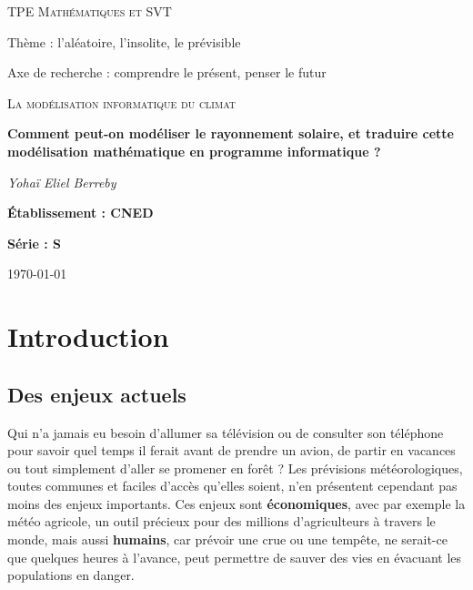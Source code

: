 \documentclass[12pt]{article}
\begin{document}

\begin{titlepage}
	\centering
	
	{\scshape\large TPE Mathématiques et SVT\par}
	\vspace{0.2cm}	
	{ \Large Thème : l'aléatoire, l'insolite, le prévisible\par }
	Axe de recherche : comprendre le présent, penser le futur\par
	\vspace{1.5cm}

	{\scshape\LARGE La modélisation informatique du climat \par}
	\vspace{1cm}
	{\huge\bfseries Comment peut-on modéliser le rayonnement solaire, et traduire cette modélisation mathématique en programme informatique ?\par}

	\vspace{1cm}
	{\Large\itshape Yohaï Eliel Berreby\par}
	
	\vfill
	
	
	{\Large\bfseries Établissement : CNED\par}
	\vspace{0.2cm}
	{\Large \bfseries Série : S }

	\vfill

	{\large \today\par}
\end{titlepage}


\clearpage
\tableofcontents{}
\clearpage


\section{Introduction} 

\subsection{Des enjeux actuels}

Qui n'a jamais eu besoin d'allumer sa télévision ou de consulter son téléphone pour savoir quel temps il ferait avant de prendre un avion, de partir en vacances ou tout simplement d'aller se promener en forêt ?
Les prévisions météorologiques, toutes communes et faciles d'accès qu'elles soient, n'en présentent cependant pas moins des enjeux importants.
Ces enjeux sont \textbf{économiques}, avec par exemple la météo agricole, un outil précieux pour des millions d'agriculteurs à travers le monde, mais aussi \textbf{humains}, car prévoir une crue ou une tempête, ne serait-ce que quelques heures à l'avance, peut permettre de sauver des vies en évacuant les populations en danger.
\end{document}

